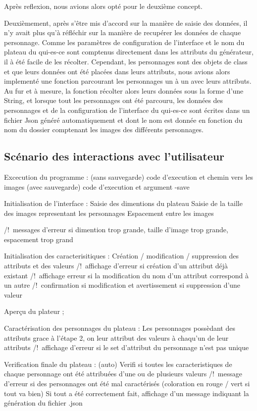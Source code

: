 \begin{}
    Après reflexion, nous avions alors opté pour le deuxième concept. 
    
    Deuxièmement, après s'être mis d'accord sur la manière de saisie des données, il n'y avait plus qu'à réfléchir 
sur la manière de recupérer les données de chaque personnage. 
Comme les paramètres de configuration de l'interface et le nom du plateau du qui-es-ce sont comptenus directement 
dans les attributs du générateur, il à été facile de les récolter. 
Cependant, les personnages sont des objets de class et que leurs données ont été placées dans leurs attributs, nous avions 
alors implementé une fonction parcourant les personnages un à un avec leurs attributs. Au fur et à mesure, la fonction 
récolter alors leurs données sous la forme d'une String, et lorsque tout les personnages ont été parcouru,
les données des personnages et de la configuration de l'interface du qui-es-ce sont écrites dans un fichier Json 
généré automatiquement et dont le nom est donnée en fonction du nom du dossier comptenant les images des différents personnages.
\end{}
\subsection{Scénario des interactions avec l'utilisateur}
\begin{}
    Excecution du programme : 
        (sans sauvegarde) code d'execution et chemin vers les images
        (avec sauvegarde) code d'execution et argument -save

    Initialisation de l'interface :
        Saisie des dimentions du plateau 
        Saisie de la taille des images representant les personnages
        Espacement entre les images

         /!\ messages d'erreur si dimention trop grande, taille d'image trop grande, espacement trop grand
    
    Initialisation des caracterisitiques : 
        Création / modification / suppression des attributs et des valeurs
            /!\ affichage d'erreur si création d'un attribut déjà existant
            /!\ affichage erreur si la modification du nom d'un attribut correspond à un autre
            /!\ confirmation si modification et avertissement si suppression d'une valeur

    Aperçu du plateur ; 

    Caractérisation des personnages du plateau :
        Les personnages possèdant des attributs grace à l'étape 2, on leur attribut des valeurs à chaqu'un de leur attributs
            /!\ affichage d'erreur si le set d'attribut du personnage n'est pas unique

    Verification finale du plateau :
        (auto) Verifi si toutes les caracteristiques de chaque personnage ont été attribuées d'une ou de plusieurs valeurs 
        /!\ message d'erreur si des personnages ont été mal caractérisés (coloration en rouge / vert si tout va bien)
        Si tout a été correctement fait, affichage d'un message indiquant la génération du fichier .json
\end{}

